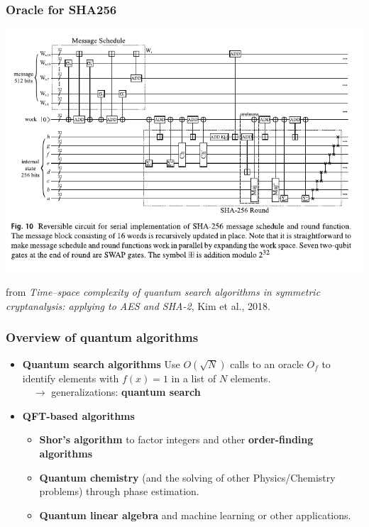 \documentclass{beamer}
\begin{document}
\begin{frame}
\frametitle{Oracle for SHA256}

\begin{center}
\includegraphics[width=.9\textwidth]{sha256.pdf}
\end{center}
{
from \emph{Time–space complexity of quantum search algorithms in symmetric cryptanalysis: applying to AES and SHA-2}, Kim et al., 2018.
}

\end{frame}

\begin{frame}
\frametitle{Overview of quantum algorithms}

\begin{itemize}
\item \textbf{Quantum search algorithms} Use $O(\sqrt{N})$ calls to an oracle $O_f$ to identify
elements with $f(x)=1$ in a list of $N$ elements.\\
 $\quad\rightarrow$ generalizations: \textbf{quantum search}
\item \textbf{QFT-based algorithms}
\begin{itemize}
\item \textbf{Shor's algorithm } to factor integers and other \textbf{order-finding algorithms}
\item \textbf{Quantum chemistry} (and the solving of other Physics/Chemistry problems) through phase estimation.
\item \textbf{Quantum linear algebra} and machine learning or other applications.
\end{itemize}                    
\end{itemize}

\end{frame}
\end{document}
